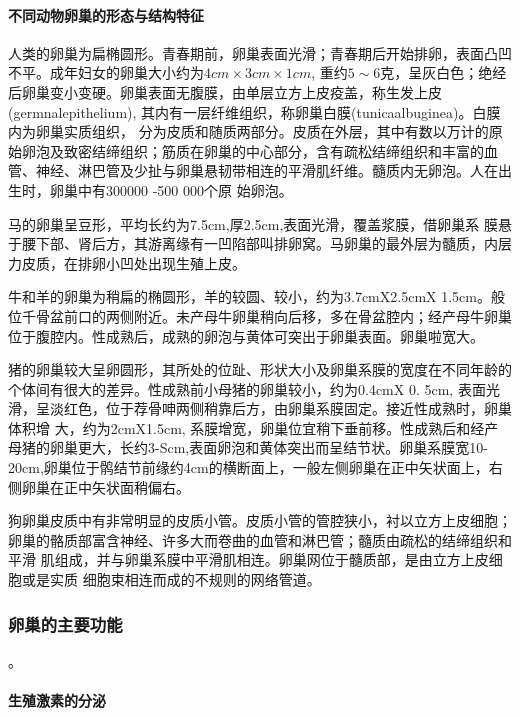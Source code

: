 \paragraph{不同动物卵巢的形态与结构特征}

人类的卵巢为扁椭圆形。青春期前，卵巢表面光滑；青春期后开始排卵，表面凸凹不平。成年妇女的卵巢大小约为$ 4cm \times 3 cm \times 1 cm $, 重约$ 5 \sim 6 $克，呈灰白色；绝经后卵巢变小变硬。卵巢表面无腹膜，由单层立方上皮疫盖，称生发上皮(germnalepithe­lium), 其内有一层纤维组织，称卵巢白膜(tunicaalbuginea)。白膜内为卵巢实质组织， 分为皮质和随质两部分。皮质在外层，其中有数以万计的原始卵泡及致密结缔组织；筋质在卵巢的中心部分，含有疏松结缔组织和丰富的血管、神经、淋巴管及少扯与卵巢悬韧带相连的平滑肌纤维。髓质内无卵泡。人在出生时，卵巢中有300000 -500 000个原 始卵泡。

马的卵巢呈豆形，平均长约为7.5cm,厚2.5cm,表面光滑，覆盖浆膜，借卵巢系 膜悬于腰下部、肾后方，其游离缘有一凹陷部叫排卵窝。马卵巢的最外层为髓质，内层力皮质，在排卵小凹处出现生殖上皮。

牛和羊的卵巢为稍扁的椭圆形，羊的较圆、较小，约为3.7cmX2.5cmX 1.5cm。般位千骨盆前口的两侧附近。未产母牛卵巢稍向后移，多在骨盆腔内；经产母牛卵巢位于腹腔内。性成熟后，成熟的卵泡与黄体可突出于卵巢表面。卵巢啦宽大。

猪的卵巢较大呈卵圆形，其所处的位趾、形状大小及卵巢系膜的宽度在不同年龄的 个体间有很大的差异。性成熟前小母猪的卵巢较小，约为0.4cmX 0. 5cm, 表面光滑，呈淡红色，位于荐骨呻两侧稍靠后方，由卵巢系膜固定。接近性成熟时，卵巢体积增 大，约为2cmX1.5cm, 系膜增宽，卵巢位宜稍下垂前移。性成熟后和经产母猪的卵巢更大，长约3-Scm,表面卵泡和黄体突出而呈结节状。卵巢系膜宽10-20cm,卵巢位于鹘结节前缘约4cm的横断面上，一般左侧卵巢在正中矢状面上，右侧卵巢在正中矢状面稍偏右。

狗卵巢皮质中有非常明显的皮质小管。皮质小管的管腔狭小，衬以立方上皮细胞； 卵巢的骼质部富含神经、许多大而卷曲的血管和淋巴管；髓质由疏松的结缔组织和平滑 肌组成，并与卵巢系膜中平滑肌相连。卵巢网位于髓质部，是由立方上皮细胞或是实质 细胞束相连而成的不规则的网络管道。


\subsubsection{卵巢的主要功能}

。

\paragraph{生殖激素的分泌}

